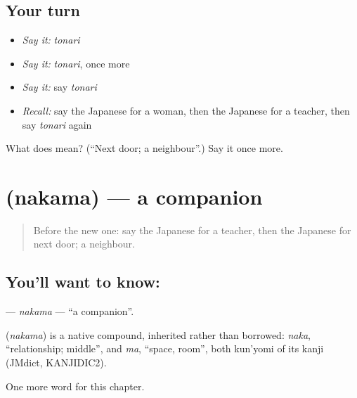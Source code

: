 \subsection*{Your turn}
\begin{itemize}
\raggedright
  \item \emph{Say it:} \emph{tonari}
  \item \emph{Say it:} \emph{tonari}, once more
  \item \emph{Say it:} say \emph{tonari}
  \item \emph{Recall:} say the Japanese for a woman, then the Japanese for a teacher, then say \emph{tonari} again
\end{itemize}

\begin{tcolorbox}[breakable,colback=teal!4,colframe=teal!35!black,title={Before you move on}]
What does  mean? (\textquotedblleft{}Next door; a neighbour\textquotedblright{}.) Say it once more.
\end{tcolorbox}
\section[\texorpdfstring{\ja{なかま} (nakama)}{なかま (nakama)}]{ (nakama) — a companion}

\label{lesson:JA-C26-nakama}



\begin{quote}
Before the new one: say the Japanese for a teacher, then the Japanese for next door; a neighbour.
\end{quote}

\subsection*{You'll want to know: }
\textbf{} — \emph{nakama} — \textquotedblleft{}a companion\textquotedblright{}.

\begin{cousinweb}
\textbf{} (\emph{nakama}) is a native compound, inherited rather than borrowed: \emph{naka}, \textquotedblleft{}relationship; middle\textquotedblright{}, and \emph{ma}, \textquotedblleft{}space, room\textquotedblright{}, both kun'yomi of its kanji (JMdict, KANJIDIC2).
\end{cousinweb}

\begin{grammarlens}[title={What you've built}]
One more word for this chapter.
\end{grammarlens}

